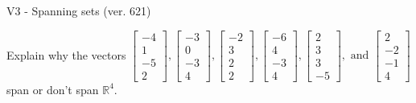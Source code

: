 \begin{exercise}
  \begin{exerciseTitle}V3 - Spanning sets (ver. 621)\end{exerciseTitle}
  \begin{exerciseStatement}
    Explain why the vectors \(\left[\begin{array}{r}
-4 \\
1 \\
-5 \\
2
\end{array}\right] , \left[\begin{array}{r}
-3 \\
0 \\
-3 \\
4
\end{array}\right] , \left[\begin{array}{r}
-2 \\
3 \\
2 \\
2
\end{array}\right] , \left[\begin{array}{r}
-6 \\
4 \\
-3 \\
4
\end{array}\right] , \left[\begin{array}{r}
2 \\
3 \\
3 \\
-5
\end{array}\right] , \text{ and } \left[\begin{array}{r}
2 \\
-2 \\
-1 \\
4
\end{array}\right]\) span or don't span \(\mathbb{R}^4\). 
	



\end{exerciseStatement}
\end{exercise}
